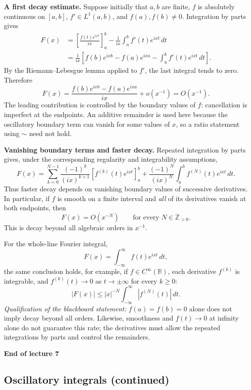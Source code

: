 \documentclass[11pt,a4paper]{article}
\begin{document}
\medskip
\noindent\textbf{A first decay estimate.}
Suppose initially that $a,b$ are finite, $f$ is absolutely continuous
on $[a,b]$, $f'\in L^1(a,b)$, and $f(a),f(b)\neq0$.
Integration by parts gives
\begin{align*}
    F(x)&=\left[\frac{f(t)e^{ixt}}{ix}\right]_a^b
    -\frac{1}{ix}\int_a^b f'(t)e^{ixt}\,dt\\
    &=\frac{1}{ix}\left[f(b)e^{ixb}-f(a)e^{ixa}
    -\int_a^b f'(t)e^{ixt}\,dt\right].
\end{align*}
By the Riemann--Lebesgue lemma applied to $f'$, the last integral tends
to zero. Therefore
\[
    \boxed{F(x)=\frac{f(b)e^{ixb}-f(a)e^{ixa}}{ix}
    +o(x^{-1})=O(x^{-1}).}
\]
The leading contribution is controlled by the boundary values of $f$:
cancellation is imperfect at the endpoints. An additive remainder is
used here because the oscillatory boundary term can vanish for some
values of $x$, so a ratio statement using $\sim$ need not hold.

\medskip
\noindent\textbf{Vanishing boundary terms and faster decay.}
Repeated integration by parts gives, under the corresponding
regularity and integrability assumptions,
\[
    F(x)=\sum_{k=0}^{N-1}\frac{(-1)^k}{(ix)^{k+1}}
    \left[f^{(k)}(t)e^{ixt}\right]_a^b
    +\frac{(-1)^N}{(ix)^N}\int_a^b f^{(N)}(t)e^{ixt}\,dt.
\]
Thus faster decay depends on vanishing boundary values of successive
derivatives. In particular, if $f$ is smooth on a finite interval and
\emph{all} of its derivatives vanish at both endpoints, then
\[
    F(x)=O(x^{-N})\qquad\text{for every }N\in\mathbb Z_{>0}.
\]
This is decay beyond all algebraic orders in $x^{-1}$.

For the whole-line Fourier integral,
\[
    F(x)=\int_{-\infty}^{\infty}f(t)e^{ixt}\,dt,
\]
the same conclusion holds, for example, if $f\in C^\infty(\mathbb R)$,
each derivative $f^{(k)}$ is integrable, and
$f^{(k)}(t)\to0$ as $t\to\pm\infty$ for every $k\geq0$:
\[
    |F(x)|\leq |x|^{-N}
    \int_{-\infty}^{\infty}|f^{(N)}(t)|\,dt.
\]
\emph{Qualification of the blackboard statement:} $f(a)=f(b)=0$ alone
does not imply decay beyond all orders. Likewise, smoothness and
$f(t)\to0$ at infinity alone do not guarantee this rate; the derivatives
must allow the repeated integrations by parts and control the remainders.

\begin{center}
    \textbf{End of lecture 7}
\end{center}

\subsection*{Oscillatory integrals (continued)}
\end{document}
